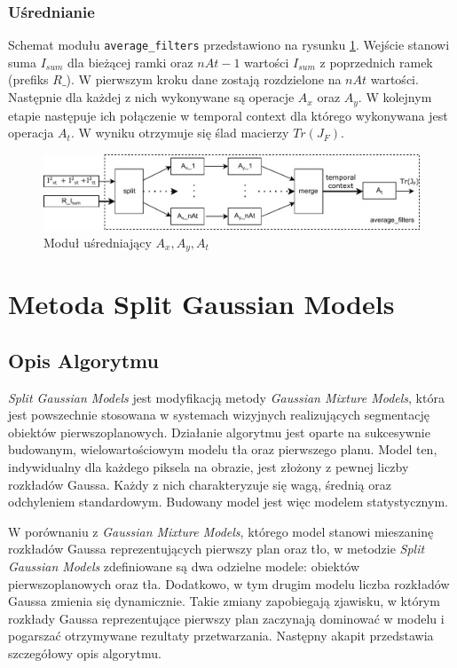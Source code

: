 \documentclass[10pt,a4paper]{article}
\begin{document}
\subsubsection{Uśrednianie}
\label{ssec:spatial_averaging}

Schemat modułu \texttt{average\_filters} przedstawiono na rysunku \ref{fig:jpk_spatial_averaging}.
Wejście stanowi suma $I_{sum}$ dla bieżącej ramki oraz $nAt-1$ wartości $I_{sum}$ z poprzednich ramek (prefiks $R\_$).
W pierwszym kroku dane zostają rozdzielone na $nAt$ wartości.
Następnie dla każdej z nich wykonywane są operacje $A_x$ oraz $A_y$.
W kolejnym etapie następuje ich połączenie w temporal context dla którego wykonywana jest operacja $A_t$.
W wyniku otrzymuje się ślad macierzy $Tr(J_F)$.

\begin{figure}[h]
	\centering
	\includegraphics[width=12cm]{img/jpk_spatial_averaging.pdf}
	\caption{Moduł uśredniający $A_x, A_y, A_t$}
	\label{fig:jpk_spatial_averaging}
\end{figure}

\section{Metoda Split Gaussian Models}
\label{sec:split_gaussian}

\subsection{Opis Algorytmu}

\textit{Split Gaussian Models} jest modyfikacją metody \textit{Gaussian Mixture Models}, która jest powszechnie stosowana w systemach wizyjnych realizujących segmentację obiektów pierwszoplanowych. Działanie algorytmu jest oparte na sukcesywnie budowanym, wielowartościowym modelu tła oraz pierwszego planu. Model ten, indywidualny dla każdego piksela na obrazie, jest złożony z pewnej liczby rozkładów Gaussa. Każdy z nich charakteryzuje się wagą, średnią oraz odchyleniem standardowym. Budowany model jest więc modelem statystycznym.

W porównaniu z \textit{Gaussian Mixture Models}, którego model stanowi mieszaninę rozkładów Gaussa reprezentujących pierwszy plan oraz tło, w metodzie \textit{Split Gaussian Models} zdefiniowane są dwa odzielne modele: obiektów pierwszoplanowych oraz tła. Dodatkowo, w tym drugim modelu liczba rozkładów Gaussa zmienia się dynamicznie. Takie zmiany zapobiegają zjawisku, w którym rozkłady Gaussa reprezentujące pierwszy plan zaczynają dominować w modelu i pogarszać otrzymywane rezultaty przetwarzania. Następny akapit przedstawia szczegółowy opis algorytmu.
\end{document}
